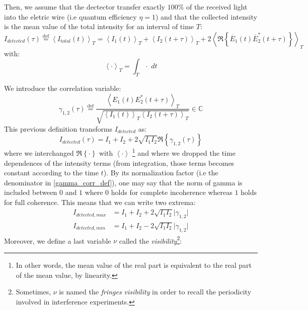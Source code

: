 \documentclass[12pt]{report}
\begin{document}
Then, we assume that the dectector transfer exactly $100\% $ of the received light into the eletric wire (i.e quantum efficiency $\eta = 1$) and that the collected intensity is the mean value of the total intensity for an interval of time $T$:
\begin{equation}
I_{detected}(\tau) \stackrel{\text{def}}{=} \left\langle I_{total}(t) \right\rangle_T = \left\langle I_1(t) \right\rangle_T + \left\langle I_2(t + \tau) \right\rangle _T + 2\left\langle \Re\left\lbrace \overline{E}_1(t) \overline{E}_2^*(t + \tau)\right\rbrace \right\rangle _T
\end{equation}
with:
\begin{equation}
\left\langle \cdot \right\rangle _T = \int_T \cdot \,\,dt
\end{equation}

We introduce the correlation variable:
\begin{equation}
\label{gamma_corr_def}
\gamma_{1,2}(\tau) \stackrel{\text{def}}{=} \frac{\left\langle E_1(t) E_2^*(t + \tau) \right\rangle _T}{\sqrt{\left\langle I_1(t) \right\rangle_T \left\langle I_2(t + \tau) \right\rangle _T }} \in \mathbb{C}
\end{equation}
This previous definition transforms $I_{detected}$ as:
\begin{equation}
I_{detected}(\tau) = I_1 + I_2 + 2\sqrt{I_1 I_2} \Re \left\lbrace \gamma_{1,2}(\tau) \right\rbrace
\end{equation}
where we interchanged $\Re \left\lbrace \cdot \right\rbrace$ with $\left\langle \cdot \right \rangle$ \footnote{In other words, the mean value of the real part is equivalent to the real part of the mean value, by linearity.} and where we dropped the time dependences of the intensity terms (from integration, those terms becomes constant according to the time $t$).
By its normalization factor (i.e the denominator in \eqref{gamma_corr_def}), one may say that the norm of gamma is included between $0$ and $1$ where $0$ holds for complete incoherence whereas $1$ holds for full coherence. This means that we can write two extrema:
\begin{align}
I_{detected, max} &= I_1 + I_2 + 2\sqrt{I_1 I_2} \vert \gamma_{1,2} \vert\\
I_{detected, min} &= I_1 + I_2 - 2\sqrt{I_1 I_2} \vert \gamma_{1,2} \vert
\end{align}
Moreover, we define a last variable $\nu$ called the \textit{visibility}\footnote{Sometimes, $\nu$ is named the \textit{fringes visibility} in order to recall the periodicity involved in interference experiments.}:
\end{document}

